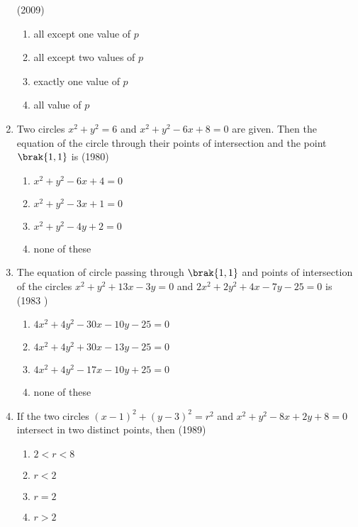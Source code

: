 \begin{enumerate}
\hfill{(2009)}
\begin{multicols}{2}
\begin{enumerate}
\item all except one value of $p$
\item all except two values of $p$
\item exactly one value of $p$
\item all value of $p$
\end{enumerate}
\end{multicols}
    \item Two circles $x^{2} + y^{2} = 6$ and $x^{2} + y^{2}-6x +8=0$ are given. Then the equation of the circle through their points of intersection and the point $\brak{1, 1}$ is \hfill {(1980)}
    \begin{multicols}{2}
\begin{enumerate}
    	\item $x^{2}+y^{2}-6x+4=0$ 
    	\item $x^{2}+y^{2}-3x+1=0$
    	\item $x^{2}+y^{2}-4y+2=0$
    	\item none of these
    \end{enumerate}
\end{multicols}
    \item The equation of circle passing through $\brak{1, 1}$ and points of intersection of the circles $x^{2}+y^{2}+13x-3y=0$ and $2x^{2}+2y^{2}+4x-7y-25=0$ is
    \hfill {(1983 )}
    \begin{multicols}{2}
\begin{enumerate}
    	\item $4x^{2}+4y^{2}-30x-10y-25=0$
    	\item $4x^{2}+4y^{2}+30x-13y-25=0$
    	\item $4x^{2}+4y^{2}-17x-10y+25=0$
    	\item none of these
    \end{enumerate}
\end{multicols}
    \item If the two circles $(x-1)^{2} + (y-3)^{2} = r^{2}$ and $x^{2}+y^{2}-8x+2y+8=0$ intersect in two distinct points,  then \hfill {(1989)} 
    \begin{multicols}{2}
\begin{enumerate}
    	\item $2<r<8$
    	\item $r<2$
    	\item $r=2$
    	\item $r>2$
    \end{enumerate}

\end{multicols}
\end{enumerate}
